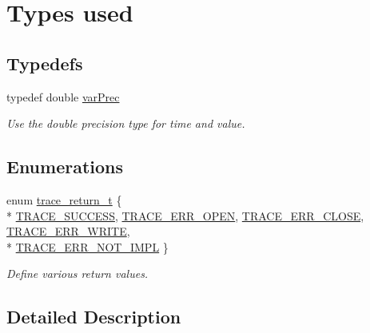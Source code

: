 \hypertarget{group__type}{\section{Types used}
\label{group__type}
}
\subsection*{Typedefs}
\begin{DoxyCompactItemize}
\item 
typedef double \hyperlink{group__type_gabda13d5bcd0cbdb094d655181a857e25}{var\-Prec}
\begin{DoxyCompactList}\small\item\em Use the double precision type for time and value. \end{DoxyCompactList}\end{DoxyCompactItemize}
\subsection*{Enumerations}
\begin{DoxyCompactItemize}
\item 
enum \hyperlink{group__type_ga1f1b68fb37d7331f03a48ef0993a0788}{trace\-\_\-return\-\_\-t} \{ \\*
\hyperlink{group__type_ga1f1b68fb37d7331f03a48ef0993a0788a6144206e9d331f185b18166cff7783b8}{T\-R\-A\-C\-E\-\_\-\-S\-U\-C\-C\-E\-S\-S}, 
\hyperlink{group__type_ga1f1b68fb37d7331f03a48ef0993a0788a3f7405d47b6ed59a17246e9844090615}{T\-R\-A\-C\-E\-\_\-\-E\-R\-R\-\_\-\-O\-P\-E\-N}, 
\hyperlink{group__type_ga1f1b68fb37d7331f03a48ef0993a0788a73950ece0ad8b1bee0e4ebe6fbf9060b}{T\-R\-A\-C\-E\-\_\-\-E\-R\-R\-\_\-\-C\-L\-O\-S\-E}, 
\hyperlink{group__type_ga1f1b68fb37d7331f03a48ef0993a0788ab9fd0214ae892b4284375940d3040b1c}{T\-R\-A\-C\-E\-\_\-\-E\-R\-R\-\_\-\-W\-R\-I\-T\-E}, 
\\*
\hyperlink{group__type_ga1f1b68fb37d7331f03a48ef0993a0788aaa3aa4a72ea96378a200bb869f7f8abb}{T\-R\-A\-C\-E\-\_\-\-E\-R\-R\-\_\-\-N\-O\-T\-\_\-\-I\-M\-P\-L}
 \}
\begin{DoxyCompactList}\small\item\em Define various return values. \end{DoxyCompactList}\end{DoxyCompactItemize}


\subsection{Detailed Description}



